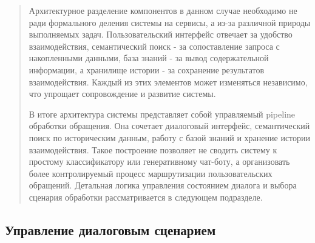 \documentclass[
]{article}
\begin{document}
\begin{quote}
Архитектурное разделение компонентов в данном случае необходимо не ради
формального деления системы на сервисы, а из-за различной природы
выполняемых задач. Пользовательский интерфейс отвечает за удобство
взаимодействия, семантический поиск - за сопоставление запроса с
накопленными данными, база знаний - за вывод содержательной информации,
а хранилище истории - за сохранение результатов взаимодействия. Каждый
из этих элементов может изменяться независимо, что упрощает
сопровождение и развитие системы.

В итоге архитектура системы представляет собой управляемый pipeline
обработки обращения. Она сочетает диалоговый интерфейс, семантический
поиск по историческим данным, работу с базой знаний и хранение истории
взаимодействия. Такое построение позволяет не сводить систему к простому
классификатору или генеративному чат-боту, а организовать более
контролируемый процесс маршрутизации пользовательских обращений.
Детальная логика управления состоянием диалога и выбора сценария
обработки рассматривается в следующем подразделе.
\end{quote}

\hypertarget{ux443ux43fux440ux430ux432ux43bux435ux43dux438ux435-ux434ux438ux430ux43bux43eux433ux43eux432ux44bux43c-ux441ux446ux435ux43dux430ux440ux438ux435ux43c}{%
\subsection{Управление диалоговым
сценарием}\label{ux443ux43fux440ux430ux432ux43bux435ux43dux438ux435-ux434ux438ux430ux43bux43eux433ux43eux432ux44bux43c-ux441ux446ux435ux43dux430ux440ux438ux435ux43c}}
\end{document}
